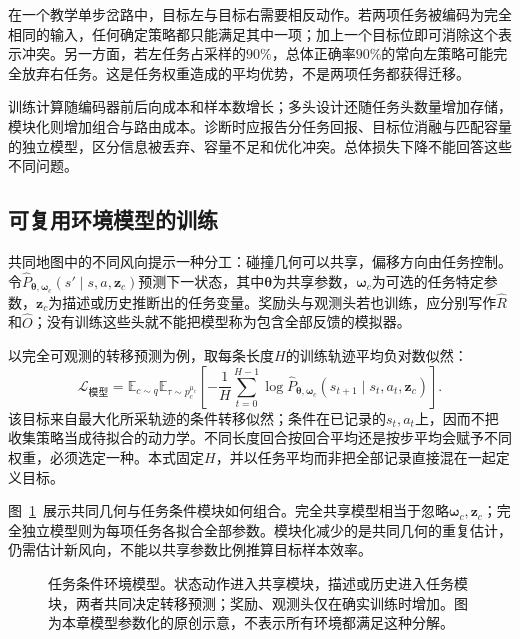在一个教学单步岔路中，目标左与目标右需要相反动作。若两项任务被编码为完全相同的输入，任何确定策略都只能满足其中一项；加上一个目标位即可消除这个表示冲突。另一方面，若左任务占采样的$90\%$，总体正确率$90\%$的常向左策略可能完全放弃右任务。这是任务权重造成的平均优势，不是两项任务都获得迁移。

训练计算随编码器前后向成本和样本数增长；多头设计还随任务头数量增加存储，模块化则增加组合与路由成本。诊断时应报告分任务回报、目标位消融与匹配容量的独立模型，区分信息被丢弃、容量不足和优化冲突。总体损失下降不能回答这些不同问题。

\subsection{可复用环境模型的训练}
\label{sec:rl-transfer-model-training}

共同地图中的不同风向提示一种分工：碰撞几何可以共享，偏移方向由任务控制。令$\widehat P_{\bm\theta,\bm\omega_c}(s'\mid s,a,\bm z_c)$预测下一状态，其中$\bm\theta$为共享参数，$\bm\omega_c$为可选的任务特定参数，$\bm z_c$为描述或历史推断出的任务变量。奖励头与观测头若也训练，应分别写作$\widehat R$和$\widehat O$；没有训练这些头就不能把模型称为包含全部反馈的模拟器。

以完全可观测的转移预测为例，取每条长度$H$的训练轨迹平均负对数似然：
\begin{equation}
 \mathcal L_{\text{模型}}
 =\mathbb E_{c\sim q}\mathbb E_{\tau\sim p_c^{\mu_c}}
 \left[-\frac1H\sum_{t=0}^{H-1}
 \log\widehat P_{\bm\theta,\bm\omega_c}
 (s_{t+1}\mid s_t,a_t,\bm z_c)\right].
 \label{eq:rl-transfer-model-loss}
\end{equation}
该目标来自最大化所采轨迹的条件转移似然；条件在已记录的$s_t,a_t$上，因而不把收集策略当成待拟合的动力学。不同长度回合按回合平均还是按步平均会赋予不同权重，必须选定一种。本式固定$H$，并以任务平均而非把全部记录直接混在一起定义目标。

图~\ref{fig:rl-transfer-model}~展示共同几何与任务条件模块如何组合。完全共享模型相当于忽略$\bm\omega_c,\bm z_c$；完全独立模型则为每项任务各拟合全部参数。模块化减少的是共同几何的重复估计，仍需估计新风向，不能以共享参数比例推算目标样本效率。

\begin{figure}[htbp]
  \centering
  
  \caption{任务条件环境模型。状态动作进入共享模块，描述或历史进入任务模块，两者共同决定转移预测；奖励、观测头仅在确实训练时增加。图为本章模型参数化的原创示意，不表示所有环境都满足这种分解。}
  \label{fig:rl-transfer-model}
\end{figure}

